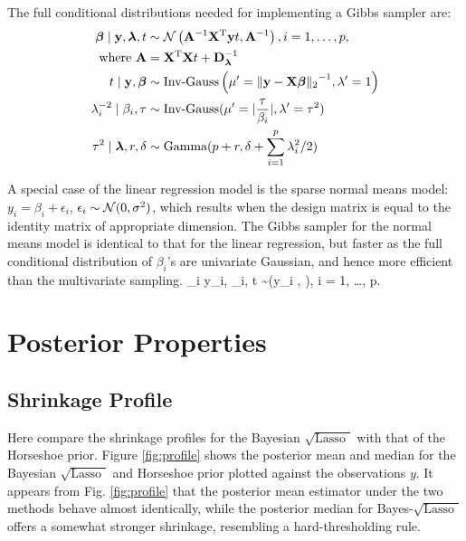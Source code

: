 \documentclass[chapters]{uamaththesis}
\def\sql{$\sqrt{\text{Lasso }}$}
\begin{document}
The full conditional distributions needed for implementing a Gibbs sampler are:	
\begin{align*}
\boldsymbol{\beta} \mid {\bf y}, \boldsymbol{\lambda}, t & \sim \mathcal{N} \left( {\bf A}^{-1}{\bf X}^{\rm T} {\bf y} t , {\bf A}^{-1} \right), i = 1, \ldots, p, \\
\text{ where } {\bf A} & = {\bf X}^{\rm T} {\bf X} t + {\bf D}_{\boldsymbol{\lambda}}^{-1} \\
t \mid {\bf y}, \boldsymbol{\beta} & \sim \text{Inv-Gauss} \left(\mu' = {\lVert{\bf y}-{\bf X}\boldsymbol{\beta}\rVert_2}^{-1}, \lambda' = 1 \right) \\
\lambda_i^{-2} \mid \beta_i, \tau & \sim \text{Inv-Gauss}(\mu' = \lvert\frac{\tau}{\beta_i}\rvert, \lambda' = \tau^2)\\
\tau^2 \mid \boldsymbol{\lambda}, r, \delta & \sim \text{Gamma}(p + r, \delta + \sum_{i=1}^{p} \lambda_i^2/2)
\end{align*}

A special case of the linear regression model is the sparse normal means model: $y_i = \beta_i + \epsilon_i$, $\epsilon_i \sim \mathcal{N}(0,\sigma^2)$, which results when the design matrix is equal to the identity matrix of appropriate dimension. The Gibbs sampler for the normal means model is identical to that for the linear regression, but faster as the full conditional distribution of $\beta_i$'s are univariate Gaussian, and hence more efficient than the multivariate sampling. 
\beq \label{BSQ_NM}
\beta_i \mid y_i, \lambda_i, t \sim \NormRV \left(y_i ,  \right), i = 1, \ldots, p.
\eeq


\section{Posterior Properties}

\subsection{Shrinkage Profile}

Here compare the shrinkage profiles for the Bayesian \sql{} with that of the Horseshoe prior. Figure \ref{fig:profile} shows the posterior mean and median for the Bayesian \sql{} and Horseshoe prior plotted against the observations $y$. It appears from Fig. \ref{fig:profile} that the posterior mean estimator under the two methods behave almost identically, while the posterior median for Bayes-\sql{} offers a somewhat stronger shrinkage, resembling a hard-thresholding rule. 
\end{document}
